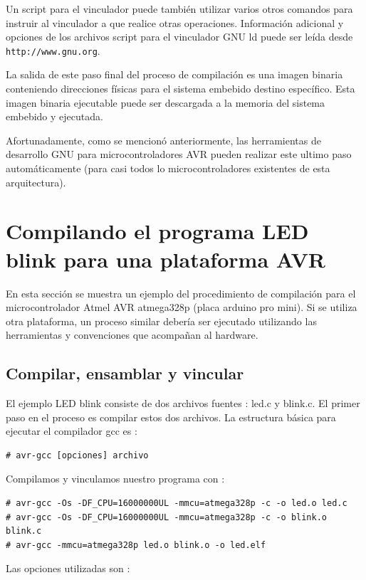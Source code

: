 \documentclass[output=paper, 
colorlinks,
citecolor=brown,
newtxmath
]{langscibook}
\begin{document}
Un script para el vinculador puede también utilizar varios otros comandos
para instruir al vinculador a que realice otras operaciones.
Información adicional y opciones de los archivos script para el vinculador GNU ld
puede ser leída desde \texttt{http://www.gnu.org}.

La salida de este paso final del proceso de compilación es una imagen binaria
conteniendo direcciones físicas para el sistema embebido destino específico.
Esta imagen binaria ejecutable puede ser descargada a la memoria del sistema embebido y ejecutada.

Afortunadamente, como se mencionó anteriormente, las herramientas de desarrollo
GNU para microcontroladores AVR pueden realizar este ultimo paso automáticamente
(para casi todos lo microcontroladores existentes de esta arquitectura).

\section {Compilando el programa LED blink para una plataforma AVR}

En esta sección se muestra un ejemplo del procedimiento de compilación 
para el microcontrolador Atmel AVR atmega328p (placa arduino pro mini).
Si se utiliza otra plataforma, un proceso similar debería ser ejecutado
utilizando las herramientas y convenciones que acompañan al hardware.

\subsection {Compilar, ensamblar y vincular}

El ejemplo LED blink consiste de dos archivos fuentes : led.c y blink.c.
El primer paso en el proceso es compilar estos dos archivos.
La estructura básica para ejecutar el compilador gcc es :

\begin{verbatim}
# avr-gcc [opciones] archivo
\end{verbatim}

Compilamos y vinculamos nuestro programa con :

\begin{verbatim}
# avr-gcc -Os -DF_CPU=16000000UL -mmcu=atmega328p -c -o led.o led.c
# avr-gcc -Os -DF_CPU=16000000UL -mmcu=atmega328p -c -o blink.o blink.c
# avr-gcc -mmcu=atmega328p led.o blink.o -o led.elf
\end{verbatim}

Las opciones utilizadas son :
\end{document}
